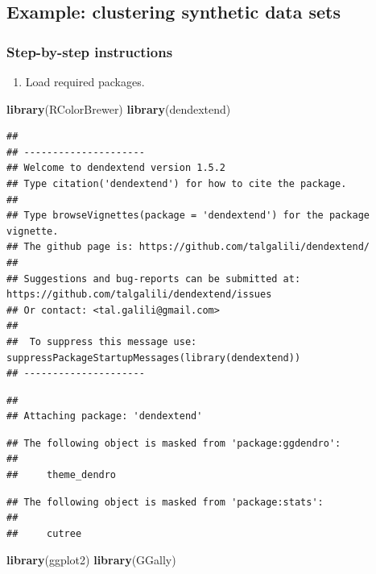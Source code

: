 \documentclass[]{book}
\newenvironment{Shaded}{\begin{snugshade}}{\end{snugshade}}
\newcommand{\KeywordTok}[1]{\textcolor[rgb]{0.13,0.29,0.53}{\textbf{{#1}}}}
\newcommand{\NormalTok}[1]{{#1}}
\providecommand{\tightlist}{%
  \setlength{\itemsep}{0pt}\setlength{\parskip}{0pt}}
\theoremstyle{definition}
\theoremstyle{definition}
\theoremstyle{definition}
\theoremstyle{remark}
\begin{document}
\subsection{Example: clustering synthetic data
sets}\label{example-clustering-synthetic-data-sets}

\subsubsection{Step-by-step
instructions}\label{step-by-step-instructions}

\begin{enumerate}
\def\labelenumi{\arabic{enumi}.}
\tightlist
\item
  Load required packages.
\end{enumerate}

\begin{Shaded}
\begin{Highlighting}[]
\KeywordTok{library}\NormalTok{(RColorBrewer)}
\KeywordTok{library}\NormalTok{(dendextend)}
\end{Highlighting}
\end{Shaded}

\begin{verbatim}
## 
## ---------------------
## Welcome to dendextend version 1.5.2
## Type citation('dendextend') for how to cite the package.
## 
## Type browseVignettes(package = 'dendextend') for the package vignette.
## The github page is: https://github.com/talgalili/dendextend/
## 
## Suggestions and bug-reports can be submitted at: https://github.com/talgalili/dendextend/issues
## Or contact: <tal.galili@gmail.com>
## 
##  To suppress this message use:  suppressPackageStartupMessages(library(dendextend))
## ---------------------
\end{verbatim}

\begin{verbatim}
## 
## Attaching package: 'dendextend'
\end{verbatim}

\begin{verbatim}
## The following object is masked from 'package:ggdendro':
## 
##     theme_dendro
\end{verbatim}

\begin{verbatim}
## The following object is masked from 'package:stats':
## 
##     cutree
\end{verbatim}

\begin{Shaded}
\begin{Highlighting}[]
\KeywordTok{library}\NormalTok{(ggplot2)}
\KeywordTok{library}\NormalTok{(GGally)}
\end{Highlighting}
\end{Shaded}
\end{document}
